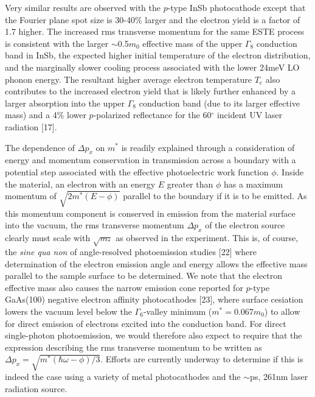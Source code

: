 Very similar results are observed with the $p$-type InSb photocathode except that the Fourier plane spot size is 30-40\%  larger and the electron yield is a factor of 1.7 higher.
The increased rms transverse momentum for the same ESTE process is consistent with the larger $\sim$0.5$m_0$ effective mass of the upper $\Gamma_8$ conduction band in InSb, the expected higher initial temperature of the electron distribution, and the marginally slower cooling process associated with the lower 24meV LO phonon energy.
The resultant higher average electron temperature $T_e$ also contributes to the increased electron yield that is likely further enhanced by a larger absorption into the upper $\Gamma_8$ conduction band (due to its larger effective mass) and a 4\% lower $p$-polarized reflectance for the 60$^{\circ}$ incident UV laser radiation [17]. 

The dependence of $\Delta p_x$ on $m^*$ is readily explained through a consideration of energy and momentum conservation in transmission across a boundary with a potential step associated with the effective photoelectric work function $\phi$.
Inside the material, an electron with an energy $E$ greater than $\phi$ has a maximum momentum of $\sqrt{2 m^* (E-\phi) }$ parallel to the boundary if it is to be emitted.
As this momentum component is conserved in emission from the material surface into the vacuum, the rms transverse momentum $\Delta p_x$ of the electron source clearly must scale with $\sqrt{m_*}$ as observed in the experiment.
This is, of course, the \textit{sine qua non} of angle-resolved photoemission studies [22] where determination of the electron emission angle and energy allows the effective mass parallel to the sample surface to be determined.
We note that the electron effective mass also causes the narrow emission cone reported for $p$-type GaAs(100) negative electron affinity photocathodes [23], where surface cesiation lowers the vacuum level below the $\Gamma_6$-valley minimum ($m^* = 0.067m_0$)  to allow for direct emission of electrons excited into the conduction band.
For direct single-photon photoemission, we would therefore also expect to require that the expression describing the rms transverse momentum to be written as $\Delta p_x = \sqrt{m^* ( \hbar \omega - \phi ) / 3 }$.
Efforts are currently underway to determine if this is indeed the case using a variety of metal photocathodes and the $\sim$ps, 261nm laser radiation source. 
